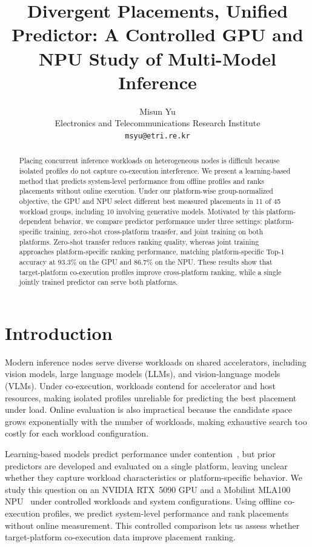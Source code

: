 \documentclass{article}
\title{Divergent Placements, Unified Predictor: A Controlled GPU and NPU Study of Multi-Model Inference}
\author{%
  Misun Yu\\
  Electronics and Telecommunications Research Institute\\
  \texttt{msyu@etri.re.kr}
}
\begin{document}
\maketitle

\begin{abstract}
Placing concurrent inference workloads on heterogeneous nodes is difficult because isolated profiles do not capture co-execution interference. We present a learning-based method that predicts system-level performance from offline profiles and ranks placements without online execution. Under our platform-wise group-normalized objective, the GPU and NPU select different best measured placements in 11 of 45 workload groups, including 10 involving generative models. Motivated by this platform-dependent behavior, we compare predictor performance under three settings: platform-specific training, zero-shot cross-platform transfer, and joint training on both platforms. Zero-shot transfer reduces ranking quality, whereas joint training approaches platform-specific ranking performance, matching platform-specific Top-1 accuracy at 93.3\% on the GPU and 86.7\% on the NPU. These results show that target-platform co-execution profiles improve cross-platform ranking, while a single jointly trained predictor can serve both platforms.
\end{abstract}


\section{Introduction}
\label{sec:intro}


Modern inference nodes serve diverse workloads on shared accelerators, including vision models, large language models (LLMs), and vision-language models (VLMs). Under co-execution, workloads contend for accelerator and host resources, making isolated profiles unreliable for predicting the best placement under load. Online evaluation is also impractical because the candidate space grows exponentially with the number of workloads, making exhaustive search too costly for each workload configuration.

Learning-based models predict performance under contention~\citep{kim_iccd2024_interference,xu_tpds2023_igniter,cui2021}, but prior predictors are developed and evaluated on a single platform, leaving unclear whether they capture workload characteristics or platform-specific behavior. We study this question on an NVIDIA RTX~5090 GPU and a Mobilint MLA100 NPU~\citep{mobilint_mla100} under controlled workloads and system configurations. Using offline co-execution profiles, we predict system-level performance and rank placements without online measurement. This controlled comparison lets us assess whether target-platform co-execution data improve placement ranking.
\end{document}
